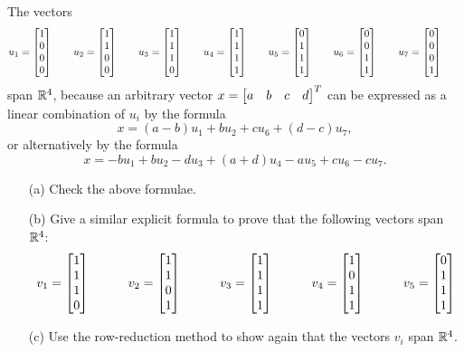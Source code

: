 \documentclass[a4paper]{amsart}
\begin{document}
\begin{exercise}\label{ex-fullspan-iii}
 The vectors 
 \[ u_1 = \left[\begin{matrix} 1 \\ 0 \\ 0 \\ 0 \end{matrix}\right] \qquad
    u_2 = \left[\begin{matrix} 1 \\ 1 \\ 0 \\ 0 \end{matrix}\right] \qquad
    u_3 = \left[\begin{matrix} 1 \\ 1 \\ 1 \\ 0 \end{matrix}\right] \qquad
    u_4 = \left[\begin{matrix} 1 \\ 1 \\ 1 \\ 1 \end{matrix}\right] \qquad
    u_5 = \left[\begin{matrix} 0 \\ 1 \\ 1 \\ 1 \end{matrix}\right] \qquad
    u_6 = \left[\begin{matrix} 0 \\ 0 \\ 1 \\ 1 \end{matrix}\right] \qquad
    u_7 = \left[\begin{matrix} 0 \\ 0 \\ 0 \\ 1 \end{matrix}\right] \qquad
 \]
 span ${\mathbb{R}}^4$, because an arbitrary vector
 $x=\left[\begin{matrix} a & b & c & d\end{matrix}\right]^T$ can be expressed as a linear combination
 of $u_i$ by the formula 
 \[ x = (a-b)u_1 + b u_2 + c u_6 + (d-c)u_7, \]
 or alternatively by the formula
 \[ x = -bu_1+bu_2-du_3+(a+d)u_4 -a u_5 + cu_6 -cu_7. \]
 \begin{itemize}
  \item[(a)] Check the above formulae.
  \item[(b)] Give a similar explicit formula to prove that the
   following vectors span ${\mathbb{R}}^4$:
   \[ v_1 = \left[\begin{matrix} 1 \\ 1 \\ 1 \\ 0 \end{matrix}\right] \hspace{3em}
      v_2 = \left[\begin{matrix} 1 \\ 1 \\ 0 \\ 1 \end{matrix}\right] \hspace{3em}
      v_3 = \left[\begin{matrix} 1 \\ 1 \\ 1 \\ 1 \end{matrix}\right] \hspace{3em}
      v_4 = \left[\begin{matrix} 1 \\ 0 \\ 1 \\ 1 \end{matrix}\right] \hspace{3em}
      v_5 = \left[\begin{matrix} 0 \\ 1 \\ 1 \\ 1 \end{matrix}\right]
   \]
  \item[(c)] Use the row-reduction method to show again that the
   vectors $v_i$ span ${\mathbb{R}}^4$.
 \end{itemize}
\end{exercise}
\end{document}
